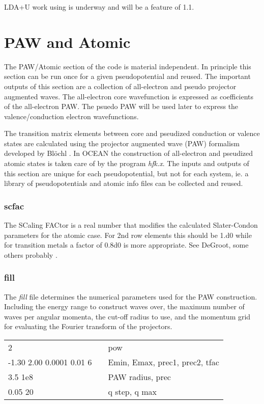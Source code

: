 \documentclass[11pt]{report}
\begin{document}
LDA+U work using  is underway and will be a feature of \OCEAN{} 1.1.


\chapter{PAW and Atomic}
\label{paw}

The PAW/Atomic section of the code is material independent. In principle this section can be run once
for a given pseudopotential and reused. The important outputs of this section are a collection of 
all-electron and pseudo projector augmented waves. The all-electron core wavefunction is expressed
as coefficients of the all-electron PAW. The psuedo PAW will be used later to express the valence/conduction
electron wavefunctions.

The transition matrix elements between core and pseudized conduction or valence states are calculated 
using the projector augmented wave (PAW) formalism developed by Bl\"{o}chl \cite{Bloechl}. In OCEAN
the construction of all-electron and pseudized atomic states is taken care of by the program \emph{hfk.x}. 
The inputs and outputs of this section are unique for each pseudopotential, but not for each system, ie. 
a library of pseudopotentials and atomic info files can be collected and reused.


\subsection{scfac}
The SCaling FACtor is a real number that modifies the calculated Slater-Condon parameters for the atomic case. For 2nd row elements this should be 1.d0 while for transition metals a factor of 0.8d0 is more appropriate. See DeGroot, some others probably \cite{SCFAC}.

\subsection{fill}
\label{fill}
The \emph{fill} file determines the numerical parameters used for the PAW construction. Including the energy range to construct waves over, the maximum number of waves per angular momenta, the cut-off radius to use, and the momentum grid for evaluating the Fourier transform of the projectors. 

\begin{center}
\begin{tabular}{| l | c l |}
\hline
2						& &  pow \\
-1.30 2.00 0.0001 0.01 6		& & Emin, Emax, prec1, prec2, tfac \\
3.5 1e8					& & PAW radius, prec \\
0.05 20					& & q step, q max \\
\hline
\end{tabular}
\end{center}
\end{document}
